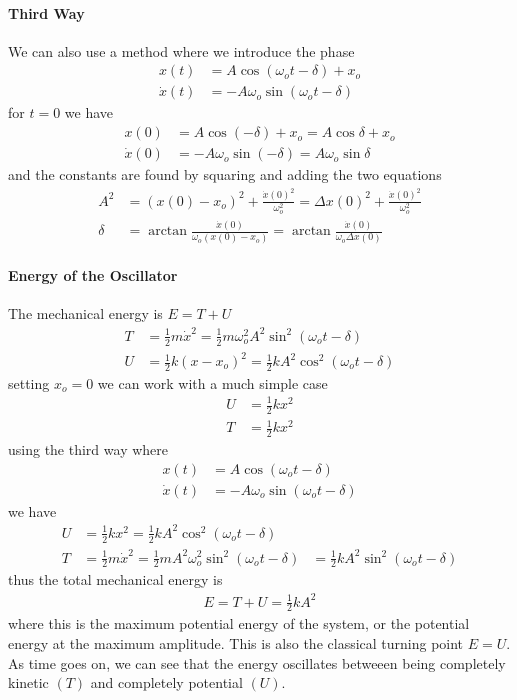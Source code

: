 \documentclass[../main.tex]{subfiles}
\begin{document}
\paragraph*{Third Way} We can also use a method where we introduce the phase
\begin{align*}
    x(t) &= A \cos(\omega_o t - \delta) + x_o \\
    \dot x(t) &= -A \omega_o \sin(\omega_o t - \delta)
\end{align*}
for $t = 0$ we have
\begin{align*}
    x(0) &= A \cos(-\delta) + x_o = A \cos \delta + x_o \\
    \dot x(0) &= -A \omega_o \sin(-\delta) = A \omega_o \sin \delta
\end{align*}
and the constants are found by squaring and adding the two equations
\begin{align*}
    A^2 &= (x(0) - x_o)^2 + \frac{\dot x(0)^2}{\omega_o^2}
        = \Delta x(0)^2 + \frac{\dot x(0)^2}{\omega_o^2}\\
    \delta &= \arctan \frac{\dot x(0)}{\omega_o (x(0) - x_o)}
        = \arctan \frac{\dot x(0)}{\omega_o \Delta x(0)}
\end{align*}

\paragraph*{Energy of the Oscillator} The mechanical energy is $E = T + U$
\begin{align*}
    T &= \frac{1}{2} m \dot x^2 = \frac{1}{2} m \omega_o^2 A^2 \sin^2(\omega_o t - \delta) \\
    U &= \frac{1}{2} k (x - x_o)^2 = \frac{1}{2} k A^2 \cos^2(\omega_o t - \delta)
\end{align*}
setting $x_o = 0$ we can work with a much simple case
\begin{align*}
    U &= \frac{1}{2} k x^2 \\  
    T &= \frac{1}{2} k x^2
\end{align*}
using the third way where
\begin{align*}
    x(t) &= A \cos(\omega_o t - \delta) \\
    \dot x(t) &= -A \omega_o \sin(\omega_o t - \delta)
\end{align*}
we have
\begin{align*}
    U &= \frac{1}{2} k x^2 = \frac{1}{2} k A^2 \cos^2(\omega_o t - \delta) \\
    T &= \frac{1}{2} m \dot x^2 = \frac{1}{2} m A^2 \omega_o^2 \sin^2(\omega_o t - \delta)
    &= \frac{1}{2} k A^2 \sin^2(\omega_o t - \delta)
\end{align*}
thus the total mechanical energy is
\begin{align*}
    E = T + U = \frac{1}{2} k A^2
\end{align*}
where this is the maximum potential energy of the system, or the potential energy at the maximum 
amplitude. This is also the classical turning point $E = U$. As time goes on, we can see that the
energy oscillates betweeen being completely kinetic $(T)$ and completely potential $(U)$.
\end{document}
